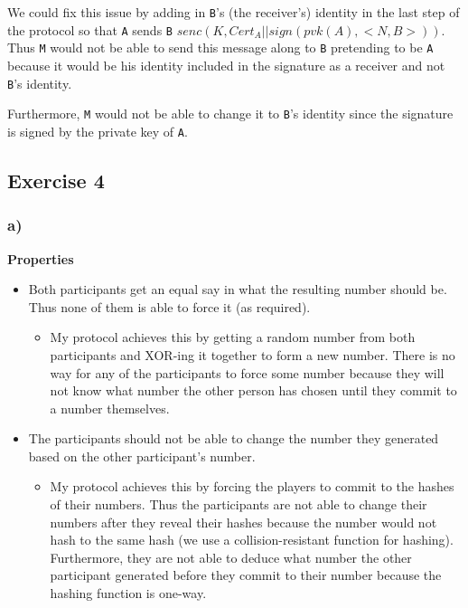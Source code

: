 \documentclass{article}
\begin{document}
We could fix this issue by adding in \texttt{B}'s (the receiver's)
identity in the last step of the protocol so that \texttt{A} sends
\texttt{B} $senc(K, Cert_A \vert \vert sign(pvk(A), <N, B>))$. Thus
\texttt{M} would not be able to send this message along to \texttt{B}
pretending to be \texttt{A} because it would be his identity included in
the signature as a receiver and not \texttt{B}'s identity.

Furthermore, \texttt{M} would not be able to change it to \texttt{B}'s
identity since the signature is signed by the private key of \texttt{A}.

    \pagebreak

    \subsection{Exercise 4}\label{exercise-4}

\subsubsection{a)}\label{a}

\textbf{Properties}

\begin{itemize}
\itemsep1pt\parskip0pt
\item
  Both participants get an equal say in what the resulting number should
  be. Thus none of them is able to force it (as required).

  \begin{itemize}
  \itemsep1pt\parskip0pt
  \item
    My protocol achieves this by getting a random number from both
    participants and XOR-ing it together to form a new number. There is
    no way for any of the participants to force some number because they
    will not know what number the other person has chosen until they
    commit to a number themselves.
  \end{itemize}
\item
  The participants should not be able to change the number they
  generated based on the other participant's number.

  \begin{itemize}
  \itemsep1pt\parskip0pt
  \item
    My protocol achieves this by forcing the players to commit to the
    hashes of their numbers. Thus the participants are not able to
    change their numbers after they reveal their hashes because the
    number would not hash to the same hash (we use a collision-resistant
    function for hashing). Furthermore, they are not able to deduce what
    number the other participant generated before they commit to their
    number because the hashing function is one-way.
  \end{itemize}
\end{itemize}
\end{document}
